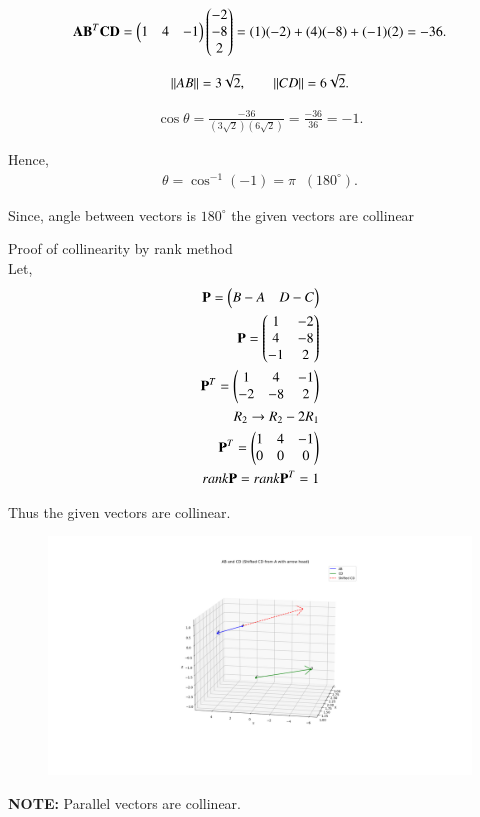 \documentclass[journal]{IEEEtran}
\begin{document}
\begin{align}
\mathbf{AB}^T \mathbf{CD} =
\begin{pmatrix}1 & 4 & -1\end{pmatrix}
\begin{pmatrix}-2\\-8\\2\end{pmatrix}
= (1)(-2)+(4)(-8)+(-1)(2) = -36.
\end{align}

\begin{align}
\left\lVert AB\right\rVert =3\sqrt{2}, 
\qquad
\left\lVert CD\right\rVert = 6\sqrt{2}.
\end{align}

\begin{align}
\cos\theta = \frac{-36}{(3\sqrt{2})(6\sqrt{2})} 
= \frac{-36}{36}=-1.
\end{align}

Hence,
\begin{align}
\theta = \cos^{-1}(-1) = \pi \;\;(180^\circ).
\end{align}

Since, angle between vectors is $180^\circ$ the given vectors are collinear

\newpage
Proof of collinearity by rank method \\
Let, 
\begin{align}
    \mathbf{P}=\begin{pmatrix}B-A & D-C\end{pmatrix} \\ 
    \mathbf{P}=\begin{pmatrix}1 & -2 \\ 
                   4 & -8 \\
                   -1 & 2\end{pmatrix} \\ 
    \mathbf{P}^T=\begin{pmatrix}1 & 4 & -1 \\
                     -2 & -8 & 2\end{pmatrix} \\ 
    R_2 \rightarrow R_2 - 2R_1 \\ 
    \mathbf{P}^T = \begin{pmatrix}1 & 4 & -1 \\ 
                       0 & 0 & 0\end{pmatrix} \\ 
    rank\mathbf{P}=rank\mathbf{P}^T = 1 \\ 
\end{align}

Thus the given vectors are collinear.


\begin{figure}[H]
    \centering
    \includegraphics[width=1\columnwidth]{Figs/plot3_1.png}
    \caption{}
    \label{fig:placeholder}
\end{figure}

\textbf{NOTE:} Parallel vectors are collinear.
\end{document}
